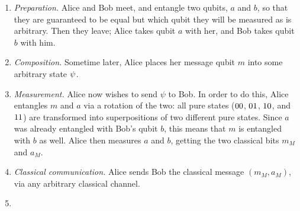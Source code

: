 \documentclass[12pt]{amsart}
\newif\ifdraft
\let\ket\relax
\newcommand{\asz}[1]{\ifdraft\textcolor{violet}{[ASZ: #1]}\fi}
\begin{document}
\begin{enumerate}
  \item \emph{Preparation.} Alice and Bob meet, and entangle two qubits, $a$ and
    $b$, so that they are guaranteed to be equal but which qubit they will be
    measured as is arbitrary.  Then they leave; Alice takes qubit $a$ with her,
    and Bob takes qubit $b$ with him.

  \item \emph{Composition.}  Sometime later, Alice places her message qubit $m$
    into some arbitrary state $\ket{\psi}$.\asz{I \emph{think} kets aren't only
    used for pure states.}

  \item \emph{Measurement.}  Alice now wishes to send $\psi$ to Bob.  In order
    to do this, Alice entangles $m$ and $a$ via a rotation\asz{check this
    terminology} of the two: all pure states ($\ket{00}$, $\ket{01}$,
    $\ket{10}$, and $\ket{11}$) are transformed into superpositions of two
    different pure states.  Since $a$ was already entangled with Bob's qubit
    $b$, this means that $m$ is entangled with $b$ as well.\asz{Should we split
    this next off into a separate step?}  Alice then measures $a$ and $b$,
    getting the two classical bits $m_M$ and $a_M$.

  \item \emph{Classical communication.}  Alice sends Bob the classical message
    $(m_M,a_M)$, via any arbitrary classical channel.

  \item \asz{I decided this isn't clear without the details.  Maybe I'll try
    explaining this to random victims -- er, friends -- and see how clear I can
    make it.} 
\end{enumerate}
\end{document}
